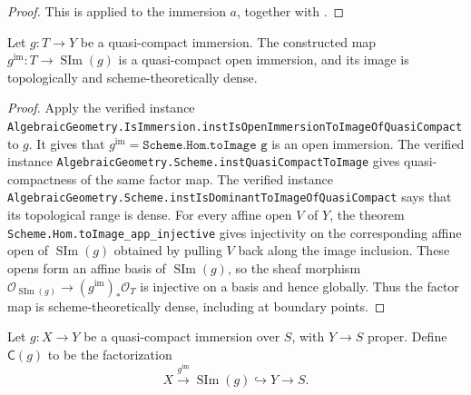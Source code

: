 \begin{proof}
  \leanok
  This is  applied to the immersion
  $a$, together with
  .
\end{proof}

\begin{lemma}
  \label{lemma:nagata-immersion-open-in-scheme-image}
  \leanok

  Let $g\colon T\to Y$ be a quasi-compact immersion.  The constructed map
  $g^{\mathrm{im}}\colon T\to\operatorname{SIm}(g)$ is a quasi-compact open
  immersion, and its image is topologically and scheme-theoretically dense.
\end{lemma}

\begin{proof}
  \leanok
  Apply the verified instance
  \texttt{AlgebraicGeometry.IsImmersion.instIsOpenImmersionToImageOfQuasiCompact}
  to $g$.  It gives that
  $g^{\mathrm{im}}=\texttt{Scheme.Hom.toImage g}$ is an open immersion.
  The verified instance
  \texttt{AlgebraicGeometry.Scheme.instQuasiCompactToImage} gives
  quasi-compactness of the same factor map.
  The verified instance
  \texttt{AlgebraicGeometry.Scheme.instIsDominantToImageOfQuasiCompact} says
  that its topological range is
  dense.  For every affine open $V$ of $Y$, the theorem
  \texttt{Scheme.Hom.toImage\_app\_injective} gives injectivity on the
  corresponding affine open of $\operatorname{SIm}(g)$ obtained by pulling
  $V$ back along the image inclusion.  These opens form an affine basis of
  $\operatorname{SIm}(g)$, so the sheaf morphism
  $\mathcal O_{\operatorname{SIm}(g)}\to
  (g^{\mathrm{im}})_*\mathcal O_T$ is injective on a basis and hence globally.
  Thus the factor map is scheme-theoretically dense, including at boundary
  points.
\end{proof}

\begin{definition}
  \label{def:nagata-immersion-compactification}
  \leanok

  Let $g\colon X\to Y$ be a quasi-compact immersion over $S$, with
  $Y\to S$ proper.  Define $\mathsf C(g)$ to be the factorization
  \[
    X\xrightarrow{g^{\mathrm{im}}}
    \operatorname{SIm}(g)\hookrightarrow Y\longrightarrow S.
  \]
\end{definition}

